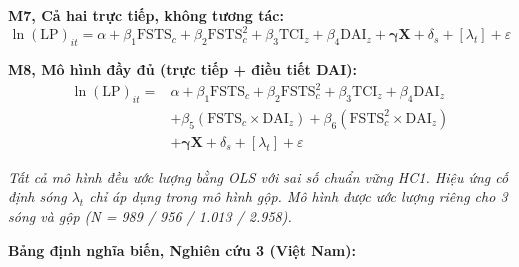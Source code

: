\documentclass[
  a4paper,
  13pt]{extreport}
\begin{document}
\textbf{M7, Cả hai trực tiếp, không tương tác:}
\[\ln(\mathrm{LP})_{it} = \alpha + \beta_1 \mathrm{FSTS}_{c} + \beta_2 \mathrm{FSTS}_{c}^{2} + \beta_3 \mathrm{TCI}_{z} + \beta_4 \mathrm{DAI}_{z} + \boldsymbol{\gamma}\mathbf{X} + \delta_s + [\lambda_t] + \varepsilon\]

\textbf{M8, Mô hình đầy đủ (trực tiếp + điều tiết DAI):}
\[\begin{aligned}
\ln(\mathrm{LP})_{it} = {} & \alpha + \beta_1 \mathrm{FSTS}_{c} + \beta_2 \mathrm{FSTS}_{c}^{2} + \beta_3 \mathrm{TCI}_{z} + \beta_4 \mathrm{DAI}_{z} \\
& + \beta_5(\mathrm{FSTS}_{c} \times \mathrm{DAI}_{z}) + \beta_6(\mathrm{FSTS}_{c}^{2} \times \mathrm{DAI}_{z}) \\
& + \boldsymbol{\gamma}\mathbf{X} + \delta_s + [\lambda_t] + \varepsilon
\end{aligned}\]

\emph{Tất cả mô hình đều ước lượng bằng OLS với sai số chuẩn vững HC1.
Hiệu ứng cố định sóng \(\lambda_t\) chỉ áp dụng trong mô hình gộp. Mô
hình được ước lượng riêng cho 3 sóng và gộp (N = 989 / 956 / 1.013 /
2.958).}

\textbf{Bảng định nghĩa biến, Nghiên cứu 3 (Việt Nam):}
\end{document}
